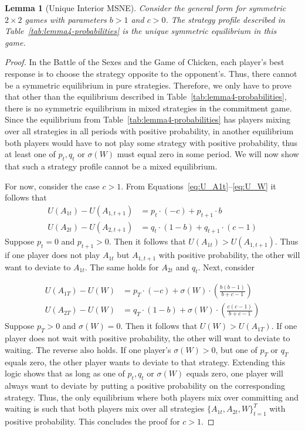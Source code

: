 \documentclass[letterpaper]{article}
\newcommand{\bparam}{b}
\newcommand{\cparam}{c}
\newtheorem{lemma}{Lemma}
\theoremstyle{definition}
\begin{document}
\begin{lemma}[Unique Interior MSNE]\label{lem:uniqueness}
Consider the general form for symmetric $2\times2$ games with parameters $\bparam > 1$ and $\cparam > 0$. The strategy profile described in Table~\ref{tab:lemma4-probabilities} is the unique symmetric equilibrium in this game. 
\end{lemma}
\begin{proof}
    In the Battle of the Sexes and the Game of Chicken, each player's best response is to choose the strategy opposite to the opponent's. Thus, there cannot be a symmetric equilibrium in pure strategies.
    Therefore, we only have to prove that other than the equilibrium described in Table~\ref{tab:lemma4-probabilities},
    there is no symmetric equilibrium in mixed strategies in the commitment game. Since the equilibrium from Table~\ref{tab:lemma4-probabilities} has players mixing over all strategies in all periods with positive probability, in another equilibrium both players would have to not play some strategy with positive probability, thus at least one of $p_t,q_t$ or $\sigma(W)$ must equal zero in some period. We will now show that such a strategy profile cannot be a mixed equilibrium.

For now, consider the case $\cparam > 1$.
From Equations~\eqref{eq:U_A1t}--\eqref{eq:U_W}
it follows that
\begin{align*}
    U(A_{1t})-U(A_{1,t+1}) &= p_t \cdot (-\cparam) + p_{t+1} \cdot \bparam \\
    U(A_{2t})-U(A_{2,t+1}) &=  q_t \cdot (1-\bparam) + q_{t+1} \cdot (\cparam-1)
\end{align*}
Suppose $p_t=0$ and $p_{t+1}>0$. Then it follows that $U(A_{1t})>U(A_{1,t+1})$. Thus if one player does not play $A_{1t}$ but $A_{1,t+1}$ with positive probability, the other will want to deviate to $A_{1t}$. The same holds for $A_{2t}$ and $q_t$. Next, consider

\begin{align*}
U(A_{1T}) - U(W) &= p_{T} \cdot (- \cparam) + \sigma(W) \cdot \left( \frac{\bparam(\bparam-1)}{\bparam+\cparam-1} \right) \\
U(A_{2T}) - U(W) &= q_{T} \cdot (1-\bparam) + \sigma(W) \cdot \left( \frac{\cparam(\cparam-1)}{\bparam+\cparam-1} \right)
\end{align*}
Suppose $p_{T}>0$ and $\sigma(W)=0$. Then it follows that $U(W)>U(A_{1T})$. If one player does not wait with positive probability, the other will want to deviate to waiting. The reverse also holds. If one player's $\sigma(W)>0$, but one of $p_T$ or $q_T$ equals zero, the other player wants to deviate to that strategy. Extending this logic shows that as long as one of $p_t,q_t$ or $\sigma(W)$ equals zero, one player will always want to deviate by putting a positive probability on the corresponding strategy. Thus, the only equilibrium where both players mix over committing and waiting is such that both players mix over all strategies $\{A_{1t}, A_{2t}, W\}_{t=1}^{T}$ with positive probability. This concludes the proof for $\cparam>1$.


\end{proof}
\end{document}
